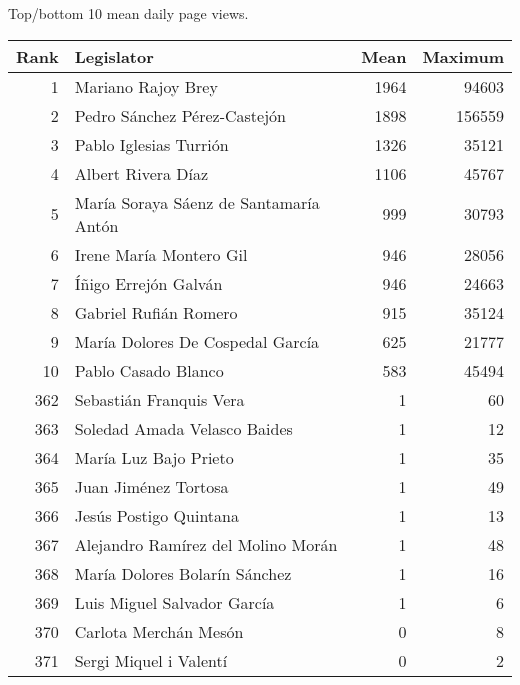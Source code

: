 \centering
\caption{Top/bottom 10 mean daily page views.\label{tab:pageviewstopesp}} 
\begingroup\scriptsize
\begin{tabular}{rlrr}
  \toprule
Rank & Legislator & Mean & Maximum \\ 
  \midrule
1 & Mariano Rajoy Brey & 1964 & 94603 \\ 
  2 & Pedro Sánchez Pérez-Castejón & 1898 & 156559 \\ 
  3 & Pablo Iglesias Turrión & 1326 & 35121 \\ 
  4 & Albert Rivera Díaz & 1106 & 45767 \\ 
  5 & María Soraya Sáenz de Santamaría Antón & 999 & 30793 \\ 
   \midrule
6 & Irene María Montero Gil & 946 & 28056 \\ 
  7 & Íñigo Errejón Galván & 946 & 24663 \\ 
  8 & Gabriel Rufián Romero & 915 & 35124 \\ 
  9 & María Dolores De Cospedal García & 625 & 21777 \\ 
  10 & Pablo Casado Blanco & 583 & 45494 \\ 
   \midrule
362 & Sebastián Franquis Vera & 1 & 60 \\ 
  363 & Soledad Amada Velasco Baides & 1 & 12 \\ 
  364 & María Luz Bajo Prieto & 1 & 35 \\ 
  365 & Juan Jiménez Tortosa & 1 & 49 \\ 
  366 & Jesús Postigo Quintana & 1 & 13 \\ 
   \midrule
367 & Alejandro Ramírez del Molino Morán & 1 & 48 \\ 
  368 & María Dolores Bolarín Sánchez & 1 & 16 \\ 
  369 & Luis Miguel Salvador García & 1 & 6 \\ 
  370 & Carlota Merchán Mesón & 0 & 8 \\ 
  371 & Sergi Miquel i Valentí & 0 & 2 \\ 
   \bottomrule
\end{tabular}
\endgroup
